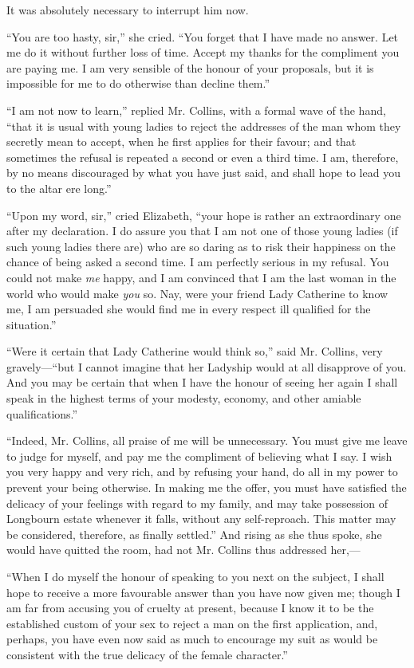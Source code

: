 \documentclass[12pt,openright]{book}
\begin{document}
It was absolutely necessary to interrupt him now.

“You are too hasty, sir,” she cried. “You forget that I have made no answer. Let me do it without further loss of time. Accept my thanks for the compliment you are paying me. I am very sensible of the honour of your proposals, but it is impossible for me to do otherwise than decline them.”

“I am not now to learn,” replied Mr. Collins, with a formal wave of the hand, “that it is usual with young ladies to reject the addresses of the man whom they secretly mean to accept, when he first applies for their favour; and that sometimes the refusal is repeated a second or even a third time. I am, therefore, by no means discouraged by what you have just said, and shall hope to lead you to the altar ere long.”

“Upon my word, sir,” cried Elizabeth, “your hope is rather an extraordinary one after my declaration. I do assure you that I am not one of those young ladies (if such young ladies there are) who are so daring as to risk their happiness on the chance of being asked a second time. I am perfectly serious in my refusal. You could not make \textit{me} happy, and I am convinced that I am the last woman in the world who would make \textit{you} so. Nay, were your friend Lady Catherine to know me, I am persuaded she would find me in every respect ill qualified for the situation.”

“Were it certain that Lady Catherine would think so,” said Mr. Collins, very gravely—“but I cannot imagine that her Ladyship would at all disapprove of you. And you may be certain that when I have the honour of seeing her again I shall speak in the highest terms of your modesty, economy, and other amiable qualifications.”

“Indeed, Mr. Collins, all praise of me will be unnecessary. You must give me leave to judge for myself, and pay me the compliment of believing what I say. I wish you very happy and very rich, and by refusing your hand, do all in my power to prevent your being otherwise. In making me the offer, you must have satisfied the delicacy of your feelings with regard to my family, and may take possession of Longbourn estate whenever it falls, without any self-reproach. This matter may be considered, therefore, as finally settled.” And rising as she thus spoke, she would have quitted the room, had not Mr. Collins thus addressed her,—

“When I do myself the honour of speaking to you next on the subject, I shall hope to receive a more favourable answer than you have now given me; though I am far from accusing you of cruelty at present, because I know it to be the established custom of your sex to reject a man on the first application, and, perhaps, you have even now said as much to encourage my suit as would be consistent with the true delicacy of the female character.”
\end{document}
